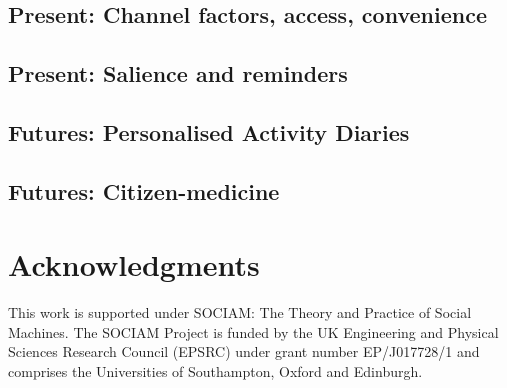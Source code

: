\documentclass{sig-alternate}
\begin{document}
\subsection{Present: Channel factors, access, convenience}
\subsection{Present: Salience and reminders}
\subsection{Futures: Personalised Activity Diaries}
\subsection{Futures: Citizen-medicine}

\section{Acknowledgments}

This work is supported under SOCIAM: The Theory and Practice of Social
Machines.  The SOCIAM Project is funded by the UK Engineering and
Physical Sciences Research Council (EPSRC) under grant number
EP/J017728/1 and comprises the Universities of Southampton, Oxford and
Edinburgh.

%

%
%


\balancecolumns %
\end{document}
